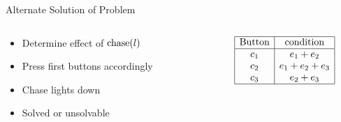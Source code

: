 \begin{frame}{Alternate Solution of Problem}
	\begin{columns}
		\begin{column}{0.45\textwidth}
			\begin{itemize}
				\item Determine effect of $\operatorname{chase}(l)$
				\item Press first buttons accordingly
				\item Chase lights down
				\item Solved or unsolvable
			\end{itemize}
		\end{column}
		\begin{column}{0.45\textwidth}
			\[
				\begin{array}{|c|c|}
					\hline
					\text{Button} & \text{condition} \\
					\hline
					c_{1} & e_{1} + e_{2}         \\
					c_{2} & e_{1} + e_{2} + e_{3} \\
					c_{3} & e_{2} + e_{3}         \\
					\hline
				\end{array}
			\]
		\end{column}
	\end{columns}
\end{frame}
